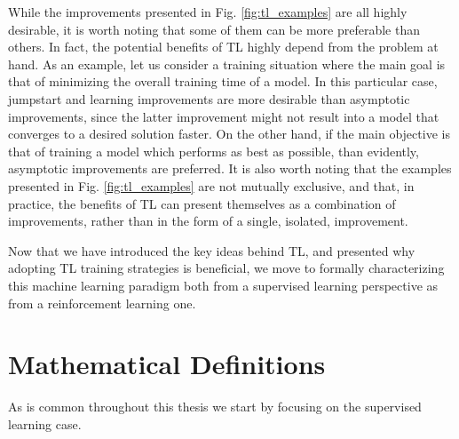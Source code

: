 While the improvements presented in Fig. \ref{fig:tl_examples} are all highly desirable, it is worth noting that some of them can be more preferable than others. In fact, the potential benefits of TL highly depend from the problem at hand. As an example, let us consider a training situation where the main goal is that of minimizing the overall training time of a model. In this particular case, jumpstart and learning improvements are more desirable than asymptotic improvements, since the latter improvement might not result into a model that converges to a desired solution faster. On the other hand, if the main objective is that of training a model which performs as best as possible, than evidently, asymptotic improvements are preferred. It is also worth noting that the examples presented in Fig. \ref{fig:tl_examples} are not mutually exclusive, and that, in practice, the benefits of TL can present themselves as a combination of improvements, rather than in the form of a single, isolated, improvement. 

Now that we have introduced the key ideas behind TL, and presented why adopting TL training strategies is beneficial, we move to formally characterizing this machine learning paradigm both from a supervised learning perspective as from a reinforcement learning one.  


\section{Mathematical Definitions}
\label{sec:definitions}

As is common throughout this thesis we start by focusing on the supervised learning case.

